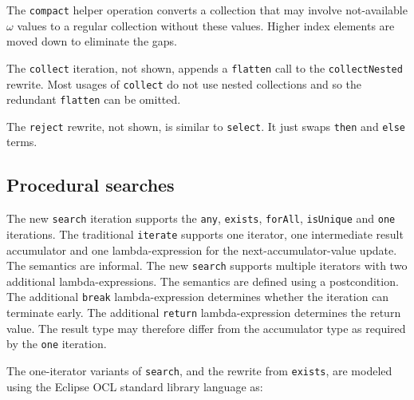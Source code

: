 \documentclass[
]{ceurart}
\begin{document}
The \verb!compact! helper operation converts a collection that may involve not-available $\omega$ values to a regular collection without these values. Higher index elements are moved down to eliminate the gaps.

The \verb!collect! iteration, not shown, appends a \verb!flatten! call to the \verb!collectNested! rewrite. Most usages of \verb!collect! do not use nested collections and so the redundant \verb!flatten! can be omitted.

The \verb!reject! rewrite, not shown, is  similar to \verb!select!. It just swaps \verb!then! and \verb!else! terms.



\subsection{Procedural searches}

The new \verb!search! iteration supports the \verb!any!, \verb!exists!, \verb!forAll!, \verb!isUnique! and \verb!one! iterations. The traditional \verb!iterate! supports one iterator, one intermediate result accumulator and one lambda-expression for the next-accumulator-value update. The semantics are informal. The new \verb!search! supports multiple iterators with two additional lambda-expressions. The semantics are defined using a postcondition. The additional \verb!break! lambda-expression determines whether the iteration can terminate early. The additional \verb!return! lambda-expression determines the return value. The result type may therefore differ from the accumulator type as required by the \verb!one! iteration.

The one-iterator variants of \verb!search!, and the rewrite from \verb!exists!, are modeled using the Eclipse OCL standard library language as:
\end{document}
